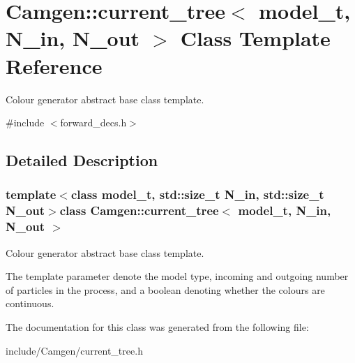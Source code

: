 \hypertarget{a00111}{}\section{Camgen\+:\+:current\+\_\+tree$<$ model\+\_\+t, N\+\_\+in, N\+\_\+out $>$ Class Template Reference}
\label{a00111}


Colour generator abstract base class template.  




{\ttfamily \#include $<$forward\+\_\+decs.\+h$>$}



\subsection{Detailed Description}
\subsubsection*{template$<$class model\+\_\+t, std\+::size\+\_\+t N\+\_\+in, std\+::size\+\_\+t N\+\_\+out$>$class Camgen\+::current\+\_\+tree$<$ model\+\_\+t, N\+\_\+in, N\+\_\+out $>$}

Colour generator abstract base class template. 

The template parameter denote the model type, incoming and outgoing number of particles in the process, and a boolean denoting whether the colours are continuous. 

The documentation for this class was generated from the following file\+:\begin{DoxyCompactItemize}
\item 
include/\+Camgen/current\+\_\+tree.\+h\end{DoxyCompactItemize}
